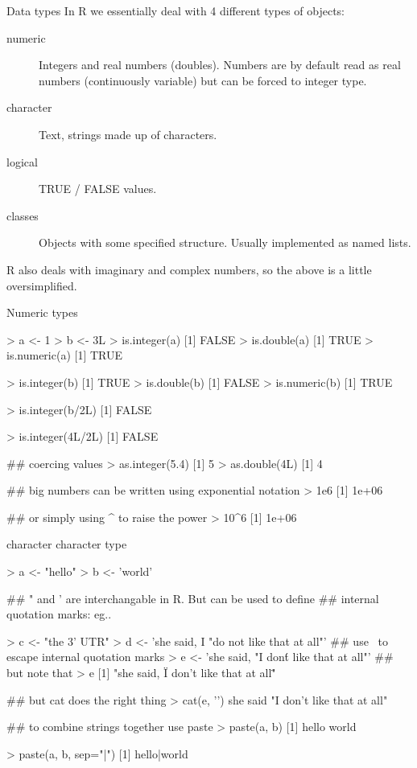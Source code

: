 \documentclass[pdf]{beamer}
\begin{document}
\begin{frame}{Data types}
  In R we essentially deal with 4 different types of objects:
  \begin{description}
  \item[numeric] Integers and real numbers (doubles). Numbers are by default read as real
    numbers (continuously variable) but can be forced to integer type.
  \item[character] Text, strings made up of characters.
  \item[logical] TRUE / FALSE values.
  \item[classes] Objects with some specified structure. Usually implemented as named lists.
  \end{description}
  
  R also deals with imaginary and complex numbers, so the above is a little oversimplified.
\end{frame}

\begin{frame}[fragile]{Numeric types}
  \begin{rcode}
    > a <- 1
    > b <- 3L
    > is.integer(a)
    [1] FALSE
    > is.double(a)
    [1] TRUE
    > is.numeric(a)
    [1] TRUE

    > is.integer(b)
    [1] TRUE
    > is.double(b)
    [1] FALSE
    > is.numeric(b)
    [1] TRUE

    > is.integer(b/2L)
    [1] FALSE

    > is.integer(4L/2L)
    [1] FALSE

    ## coercing values
    > as.integer(5.4)
    [1] 5
    > as.double(4L)
    [1] 4

    ## big numbers can be written using exponential notation
    > 1e6
    [1] 1e+06

    ## or simply using ^ to raise the power
    > 10^6
    [1] 1e+06
    
  \end{rcode}
\end{frame}

\begin{frame}[fragile]{character}
character type

\begin{rcode}
  > a <- "hello"
  > b <- 'world'

  ## " and ' are interchangable in R. But can be used to define
  ## internal quotation marks: eg..
  
  > c <- "the 3' UTR"
  > d <- 'she said, I "do not like that at all"'
  ## use \ to escape internal quotation marks
  > e <- 'she said, "I don\'t like that at all"'
  ## but note that
  > e
  [1] "she said, \"I don't like that at all\""
  
  ## but cat does the right thing
  > cat(e, '\n')
  she said "I don't like that at all"

  ## to combine strings together use paste
  > paste(a, b)
  [1] hello world

  > paste(a, b, sep="|")
  [1] hello|world
\end{rcode}
\end{frame}
\end{document}
